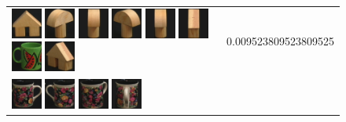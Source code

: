 \begin{figure}[tbp]
\begin{tabular}{m{11cm} | m{3cm} |}
\includegraphics[width=1cm]{coil/beeld-42.eps}
\includegraphics[width=1cm]{coil/beeld-3.eps}
\includegraphics[width=1cm]{coil/beeld-5.eps}
\includegraphics[width=1cm]{coil/beeld-4.eps}
\includegraphics[width=1cm]{coil/beeld-2.eps}
\includegraphics[width=1cm]{coil/beeld-47.eps}
\includegraphics[width=1cm]{coil/beeld-31.eps}
\includegraphics[width=1cm]{coil/beeld-46.eps}
& {\scriptsize 0.009523809523809525}
\\
\includegraphics[width=1cm]{coil/beeld-60.eps}
\includegraphics[width=1cm]{coil/beeld-61.eps}
\includegraphics[width=1cm]{coil/beeld-63.eps}
\includegraphics[width=1cm]{coil/beeld-65.eps}

\end{tabular}
\end{figure}
